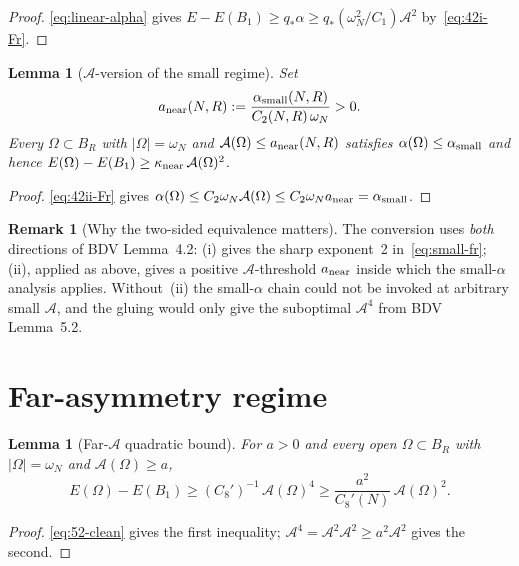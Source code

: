\documentclass[11pt]{article}
\newtheorem{lemma}[theorem]{Lemma}
\theoremstyle{definition}
\newtheorem{remark}[theorem]{Remark}
\newcommand{\Fr}{\mathcal{A}}
\begin{document}
\begin{proof}
\eqref{eq:linear-alpha} gives $E-E(B_{1})\ge q_{*}\alpha\ge
q_{*}(\omega_{N}^{2}/C_{1})\Fr^{2}$ by~\eqref{eq:42i-Fr}.
\end{proof}

\begin{lemma}[$\Fr$-version of the small regime]\label{lem:Fr-small}
Set
\begin{equation}\label{eq:a-near-def}
   a_{\rm near}(N,R):=\frac{\alpha_{\rm small}(N,R)}{C_{2}(N,R)\,\omega_{N}}>0.
\end{equation}
Every $\Omega\subset B_{R}$ with $|\Omega|=\omega_{N}$ and
$\Fr(\Omega)\le a_{\rm near}(N,R)$ satisfies
$\alpha(\Omega)\le\alpha_{\rm small}$ and hence
$E(\Omega)-E(B_{1})\ge\kappa_{\rm near}\,\Fr(\Omega)^{2}$.
\end{lemma}

\begin{proof}
\eqref{eq:42ii-Fr} gives $\alpha(\Omega)\le C_{2}\omega_{N}\Fr(\Omega)\le
C_{2}\omega_{N}a_{\rm near}=\alpha_{\rm small}$.
\end{proof}

\begin{remark}[Why the two-sided equivalence matters]
The conversion uses \emph{both} directions of BDV Lemma~4.2:
(i) gives the sharp exponent~2 in~\eqref{eq:small-fr};
(ii), applied as above, gives a positive $\Fr$-threshold $a_{\rm near}$
inside which the small-$\alpha$ analysis applies. Without~(ii) the
small-$\alpha$ chain could not be invoked at arbitrary small $\Fr$, and
the gluing would only give the suboptimal $\Fr^{4}$ from BDV Lemma~5.2.
\end{remark}

\section{Far-asymmetry regime}\label{sec:far}

\begin{lemma}[Far-$\Fr$ quadratic bound]\label{lem:far}
For $a>0$ and every open $\Omega\subset B_{R}$ with $|\Omega|=\omega_{N}$
and $\Fr(\Omega)\ge a$,
\begin{equation}\label{eq:far}
   E(\Omega)-E(B_{1})\ge(C_{8}')^{-1}\,\Fr(\Omega)^{4}
   \ge\frac{a^{2}}{C_{8}'(N)}\,\Fr(\Omega)^{2}.
\end{equation}
\end{lemma}

\begin{proof}
\eqref{eq:52-clean} gives the first inequality; $\Fr^{4}=\Fr^{2}\Fr^{2}\ge
a^{2}\Fr^{2}$ gives the second.
\end{proof}
\end{document}
